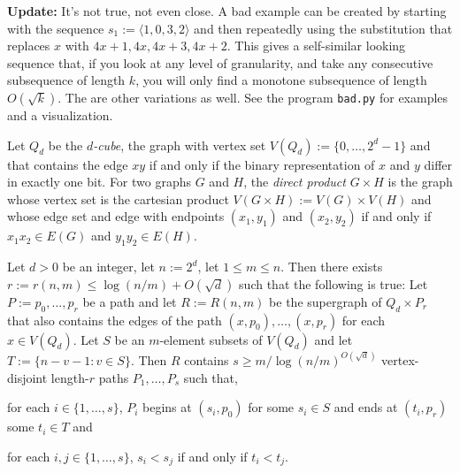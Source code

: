 \documentclass{patmorin}
\begin{document}
\textbf{Update:} It's not true, not even close.  A bad example can be created by starting with the sequence $s_1:=\langle 1,0,3,2\rangle$ and then repeatedly using the substitution that replaces $x$ with $4x+1, 4x, 4x+3, 4x+2$.  This gives a self-similar looking sequence that, if you look at any level of granularity, and take any consecutive subsequence of length $k$, you will only find a monotone subsequence of length $O(\sqrt{k})$. The are other variations as well. See the program \texttt{bad.py} for examples and a visualization.

Let $Q_d$ be the \emph{$d$-cube}, the graph with vertex set $V(Q_d):=\{0,\ldots,2^d-1\}$ and that contains the edge $xy$ if and only if the binary representation of $x$ and $y$ differ in exactly one bit.  For two graphs $G$ and $H$, the \emph{direct product} $G\times H$ is the graph whose vertex set is the cartesian product $V(G\times H):=V(G)\times V(H)$ and whose edge set and edge with endpoints $(x_1,y_1)$ and $(x_2,y_2)$ if and only if $x_1x_2\in E(G)$ and $y_1y_2\in E(H)$.

\begin{lem}\label{routing}
    Let $d>0$ be an integer, let $n:=2^d$, let $1 \le m\le n$.
    Then there exists $r:=r(n,m)\le \log(n/m)+O(\sqrt{d})$ such that the following is true:  Let $P:=p_0,\ldots,p_r$ be a path and let $R:=R(n,m)$ be the supergraph of $Q_d\times P_r$ that also contains the edges of the path $(x,p_0),\ldots,(x,p_r)$ for each $x\in V(Q_d)$.  Let $S$ be an $m$-element subsets of $V(Q_d)$ and let $T:=\{n-v-1:v\in S\}$.   Then $R$ contains $s\ge m/\log(n/m)^{O(\sqrt{d})}$ vertex-disjoint length-$r$ paths $P_1,\ldots,P_s$ such that,
    \begin{compactenum}
        \item for each $i\in\{1,\ldots,s\}$, $P_i$ begins at $(s_i,p_0)$ for some $s_i\in S$ and ends at $(t_i,p_r)$ some $t_i\in T$ and
        \item for each $i,j\in\{1,\ldots,s\}$, $s_i < s_j$ if and only if $t_i < t_j$.
    \end{compactenum}
\end{lem}
\end{document}

